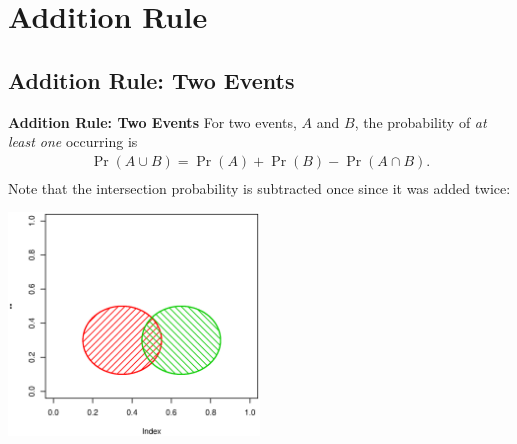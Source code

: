 \documentclass[compress]{beamer}        %
\makeatletter
\newcommand{\tcb}{\textcolor{beamer@blendedblue}}
\makeatother
\begin{document}
\section{Addition Rule}
\subsection{Addition Rule: Two Events}
\begin{frame}{\bf \tcb{Addition Rule: Two Events}}
For two events, $A$ and $B$, the probability of \emph{at least one} occurring is
\begin{align*}
\boxed{\Pr(A \cup B) = \Pr(A) + \Pr(B) - \Pr(A \cap B)}.\\
\end{align*}
Note that the intersection probability is subtracted once since it was added twice:\vspace{-0.6cm}
\begin{center}
\includegraphics[width=0.5\textwidth, trim = 3.3cm 3.8cm 2.3cm 6cm, clip]{AdditionRule}
\end{center}

\end{frame}
\end{document}
